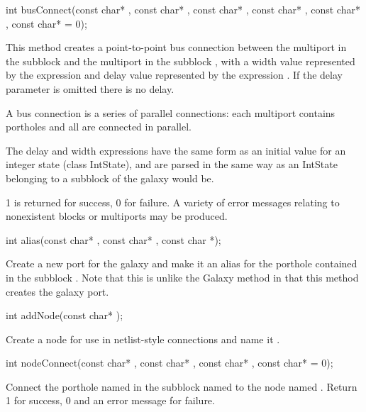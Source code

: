 \begin{example}
int busConnect(const char* , const char* ,
               const char* , const char* ,
               const char* , const char*  = 0);
\end{example}

This method creates a point-to-point bus connection between the multiport
 in the subblock  and the multiport 
in the subblock , with a width value represented by the
expression  and delay value represented by
the expression .  If the delay parameter is omitted there is
no delay.

A bus connection is a series of parallel connections: each multiport
contains  portholes and all are connected in parallel.

The delay and width expressions have the same form as an initial value for an
integer state (class IntState), and are parsed in the same way as
an IntState belonging to a subblock of the galaxy would be.

1 is returned for success, 0 for failure.
A variety of error messages relating to nonexistent blocks or multiports
may be produced.

\begin{example}
int alias(const char* , const char* , const char *);
\end{example}

Create a new port for the galaxy and make it an alias for the porthole
 contained in the subblock .  Note that this
is unlike the Galaxy  method in that this method creates
the galaxy port.

\begin{example}
int addNode(const char* );
\end{example}

Create a node for use in netlist-style connections and name it
.

\begin{example}
int nodeConnect(const char* , const char* ,
                const char* , const char*  = 0);
\end{example}

Connect the porthole named  in the subblock named
 to the node named .  Return 1 for success,
0 and an error message for failure.

